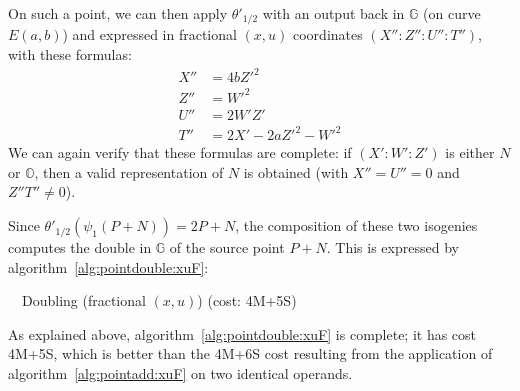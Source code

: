 \documentclass{llncs}
\newcommand{\bG}{\mathbb{G}}
\newcommand{\neutral}{\mathbb{O}}
\begin{document}
On such a point, we can then apply $\theta'_{1/2}$ with an output back
in $\bG$ (on curve $E(a,b)$) and expressed in fractional $(x,u)$
coordinates $(X''{:}Z''{:}U''{:}T'')$, with these formulas:
\begin{align*}
    X'' &= 4b Z'^2 \\
    Z'' &= W'^2 \\
    U'' &= 2W'Z' \\
    T'' &= 2X' - 2a Z'^2 - W'^2
\end{align*}
We can again verify that these formulas are complete: if $(X'{:}W'{:}Z')$
is either $N$ or $\neutral$, then a valid representation of $N$ is obtained
(with $X'' = U'' = 0$ and $Z'' T'' \neq 0$).

Since $\theta'_{1/2}(\psi_1(P+N)) = 2P+N$, the composition of these two
isogenies computes the double in $\bG$ of the source point $P+N$. This
is expressed by algorithm~\ref{alg:pointdouble:xuF}:

\begin{algorithm}[H]
    \caption{\ \ Doubling (fractional $(x,u)$) (cost: 4M+5S)}\label{alg:pointdouble:xuF}
    \begin{algorithmic}[1]
    \end{algorithmic}
\end{algorithm}

As explained above, algorithm~\ref{alg:pointdouble:xuF} is complete; it
has cost 4M+5S, which is better than the 4M+6S cost resulting from the
application of algorithm~\ref{alg:pointadd:xuF} on two identical operands.
\end{document}
